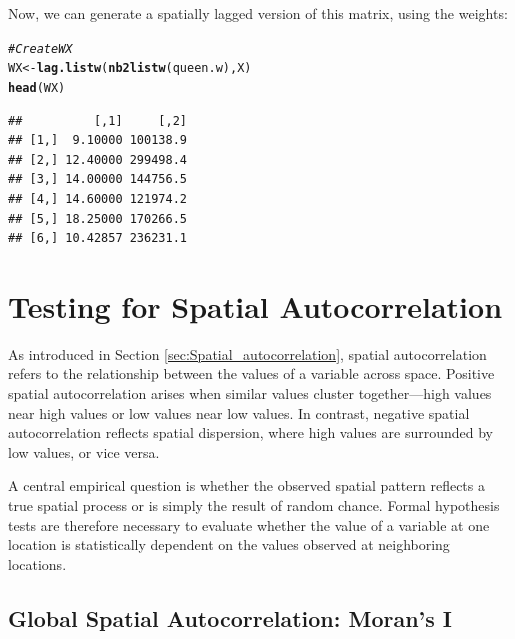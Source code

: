 \documentclass[english,12pt]{book}\usepackage[]{graphicx}\usepackage[]{xcolor}
\makeatletter
\newcommand{\hlcom}[1]{\textcolor[rgb]{0.678,0.584,0.686}{\textit{#1}}}%
\newcommand{\hldef}[1]{\textcolor[rgb]{0.345,0.345,0.345}{#1}}%
\newcommand{\hlkwb}[1]{\textcolor[rgb]{0.69,0.353,0.396}{#1}}%
\newcommand{\hlkwd}[1]{\textcolor[rgb]{0.737,0.353,0.396}{\textbf{#1}}}%
\newenvironment{kframe}{%
 \def\at@end@of@kframe{}%
 \ifinner\ifhmode%
  \def\at@end@of@kframe{\end{minipage}}%
  \begin{minipage}{\columnwidth}%
 \fi\fi%
 \def\FrameCommand##1{\hskip\@totalleftmargin \hskip-\fboxsep
 \colorbox{shadecolor}{##1}\hskip-\fboxsep
     \hskip-\linewidth \hskip-\@totalleftmargin \hskip\columnwidth}%
 \MakeFramed {\advance\hsize-\width
   \@totalleftmargin\z@ \linewidth\hsize
   \@setminipage}}%
 {\par\unskip\endMakeFramed%
 \at@end@of@kframe}
\newenvironment{knitrout}{}{} %
\makeatother
\begin{document}
Now, we can generate a spatially lagged version of this matrix, using the  weights:

\begin{knitrout}
\color{fgcolor}\begin{kframe}
\begin{alltt}
\hlcom{# Create WX}
\hldef{WX} \hlkwb{<-} \hlkwd{lag.listw}\hldef{(}\hlkwd{nb2listw}\hldef{(queen.w), X)}
\hlkwd{head}\hldef{(WX)}
\end{alltt}
\begin{verbatim}
##          [,1]     [,2]
## [1,]  9.10000 100138.9
## [2,] 12.40000 299498.4
## [3,] 14.00000 144756.5
## [4,] 14.60000 121974.2
## [5,] 18.25000 170266.5
## [6,] 10.42857 236231.1
\end{verbatim}
\end{kframe}
\end{knitrout}


\section{Testing for Spatial Autocorrelation}

As introduced in Section \ref{sec:Spatial_autocorrelation}, spatial autocorrelation refers to the relationship between the values of a variable across space. Positive spatial autocorrelation arises when similar values cluster together—high values near high values or low values near low values. In contrast, negative spatial autocorrelation reflects spatial dispersion, where high values are surrounded by low values, or vice versa.

A central empirical question is whether the observed spatial pattern reflects a true spatial process or is simply the result of random chance. Formal hypothesis tests are therefore necessary to evaluate whether the value of a variable at one location is statistically dependent on the values observed at neighboring locations.


\subsection{Global Spatial Autocorrelation: Moran's I}\label{sec:moransI}
\end{document}
